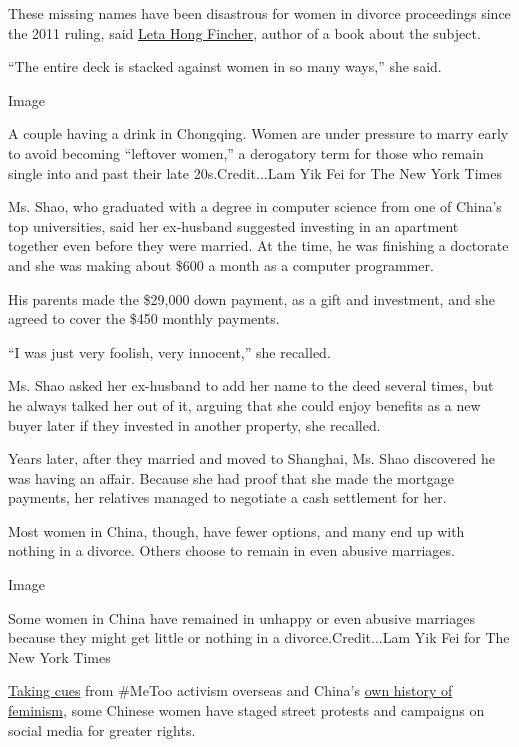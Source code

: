 These missing names have been disastrous for women in divorce
proceedings since the 2011 ruling, said
\href{https://www.letahongfincher.com/about}{Leta Hong Fincher}, author
of a book about the subject.

``The entire deck is stacked against women in so many ways,'' she said.

Image

A couple having a drink in Chongqing. Women are under pressure to marry
early to avoid becoming ``leftover women,'' a derogatory term for those
who remain single into and past their late 20s.Credit...Lam Yik Fei for
The New York Times

Ms. Shao, who graduated with a degree in computer science from one of
China's top universities, said her ex-husband suggested investing in an
apartment together even before they were married. At the time, he was
finishing a doctorate and she was making about \$600 a month as a
computer programmer.

His parents made the \$29,000 down payment, as a gift and investment,
and she agreed to cover the \$450 monthly payments.

``I was just very foolish, very innocent,'' she recalled.

Ms. Shao asked her ex-husband to add her name to the deed several times,
but he always talked her out of it, arguing that she could enjoy
benefits as a new buyer later if they invested in another property, she
recalled.

Years later, after they married and moved to Shanghai, Ms. Shao
discovered he was having an affair. Because she had proof that she made
the mortgage payments, her relatives managed to negotiate a cash
settlement for her.

Most women in China, though, have fewer options, and many end up with
nothing in a divorce. Others choose to remain in even abusive marriages.

Image

Some women in China have remained in unhappy or even abusive marriages
because they might get little or nothing in a divorce.Credit...Lam Yik
Fei for The New York Times

\href{https://www.nytimes3xbfgragh.onion/2018/07/26/world/asia/china-metoo.html}{Taking
cues} from \#MeToo activism overseas and China's
\href{https://www.nytimes3xbfgragh.onion/interactive/2018/obituaries/overlooked-qiu-jin.html}{own
history of feminism}, some Chinese women have staged street protests and
campaigns on social media for greater rights.

